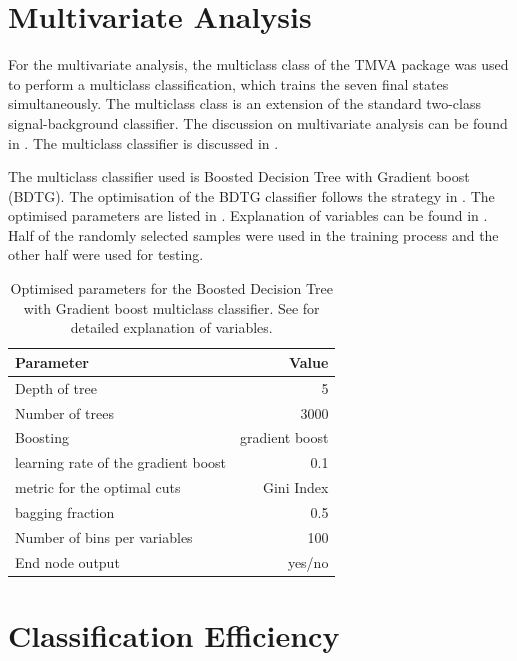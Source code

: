 \section{Multivariate Analysis}
\label{sec:tauMVA}
For the multivariate analysis, the multiclass class of the TMVA package \cite{Therhaag:2009dp} was used to perform a multiclass classification, which trains the seven final states simultaneously. The multiclass class is an extension of the standard two-class signal-background classifier. The discussion on multivariate analysis can be found in . The multiclass classifier is discussed in .

The multiclass classifier used is Boosted Decision Tree with Gradient boost (BDTG). The optimisation of the BDTG classifier follows the strategy in . The optimised parameters are listed in . Explanation of variables can be found in .  Half of the randomly selected samples were used in the training process and the other half were used for testing.

\begin{table}[!tbp]\centering
\begin{tabular}{lr}
\hline \hline
 Parameter &  Value \\
\hline
Depth of tree & 5 \\
Number of trees & 3000 \\
Boosting & gradient boost \\
learning rate of the gradient boost & 0.1 \\
metric for the optimal cuts & Gini Index \\
bagging fraction & 0.5 \\
Number of bins per variables & 100 \\
End node output & yes/no \\
\hline \hline
\end{tabular}

\caption
{Optimised parameters for the Boosted Decision Tree with Gradient boost multiclass classifier. See  for detailed explanation of variables.}
\label{tab:tauBDTparameters}
\end{table}


\section{Classification Efficiency}

